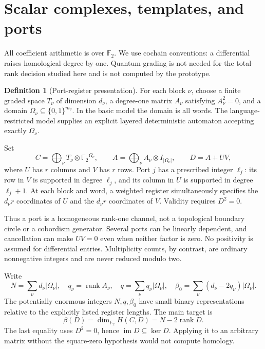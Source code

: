 \documentclass[11pt,letterpaper]{article}
\newcommand{\F}{{\mathbb F_2}}
\newcommand{\rk}{\operatorname{rank}}
\newcommand{\im}{\operatorname{im}}
\theoremstyle{definition}
\newtheorem{definition}[theorem]{Definition}
\theoremstyle{remark}
\numberwithin{equation}{section}
\begin{document}
\section{Scalar complexes, templates, and ports}
\label{sec:model}

All coefficient arithmetic is over $\F$. We use cochain conventions:
a differential raises homological degree by one. Quantum grading is not
needed for the total-rank decision studied here and is not computed by the
prototype.

\begin{definition}[Port-register presentation]
For each block $\nu$, choose a finite graded space $T_\nu$ of dimension
$d_\nu$, a degree-one matrix $A_\nu$ satisfying $A_\nu^2=0$, and a domain
$\Omega_\nu\subseteq\{0,1\}^{m_\nu}$. In the basic model the domain is all
words. The language-restricted model supplies an explicit layered
deterministic automaton accepting exactly $\Omega_\nu$.

Set
\begin{equation}
 C=\bigoplus_\nu T_\nu\otimes\F^{\Omega_\nu},\qquad
 A=\bigoplus_\nu A_\nu\otimes I_{|\Omega_\nu|},\qquad D=A+UV,
 \label{eq:model}
\end{equation}
where $U$ has $r$ columns and $V$ has $r$ rows. Port $j$ has a prescribed
integer $\ell_j$: its row in $V$ is supported in degree $\ell_j$, and its
column in $U$ is supported in degree $\ell_j+1$. At each block and word,
a weighted register simultaneously specifies the $d_\nu r$ coordinates
of $U$ and the $d_\nu r$ coordinates of $V$. Validity requires $D^2=0$.
\end{definition}

Thus a port is a homogeneous rank-one channel, not a topological boundary
circle or a cobordism generator. Several ports can be linearly dependent,
and cancellation can make $UV=0$ even when neither factor is zero.
No positivity is assumed for differential entries. Multiplicity counts,
by contrast, are ordinary nonnegative integers and are never reduced
modulo two.

Write
\begin{equation}
 N=\sum_\nu d_\nu|\Omega_\nu|,\quad
 q_\nu=\rk A_\nu,\quad
 q=\sum_\nu q_\nu|\Omega_\nu|,\quad
 \beta_0=\sum_\nu(d_\nu-2q_\nu)|\Omega_\nu|.
 \label{eq:basecounts}
\end{equation}
The potentially enormous integers $N,q,\beta_0$ have small binary
representations relative to the explicitly listed register lengths.
The main target is
\begin{equation}
 \beta(D)=\dim_\F H(C,D)=N-2\rk D.
 \label{eq:beta}
\end{equation}
The last equality uses $D^2=0$, hence $\im D\subseteq\ker D$.
Applying it to an arbitrary matrix without the square-zero hypothesis
would not compute homology.
\end{document}
